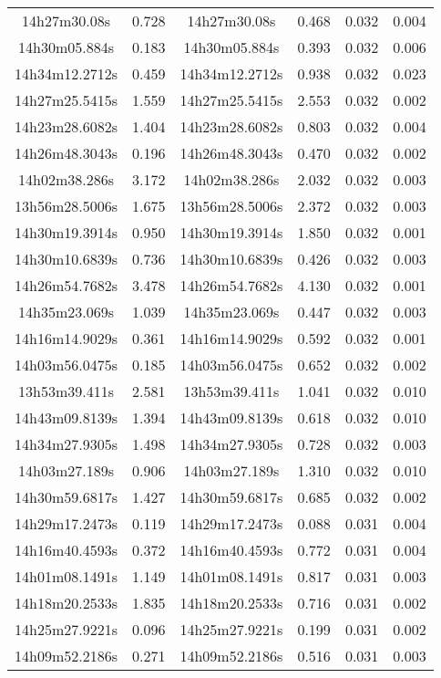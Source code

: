 \begin{table}
\begin{tabular}{cccccc}
14h27m30.08s & 0.728 & 14h27m30.08s & 0.468 & 0.032 & 0.004 \\
14h30m05.884s & 0.183 & 14h30m05.884s & 0.393 & 0.032 & 0.006 \\
14h34m12.2712s & 0.459 & 14h34m12.2712s & 0.938 & 0.032 & 0.023 \\
14h27m25.5415s & 1.559 & 14h27m25.5415s & 2.553 & 0.032 & 0.002 \\
14h23m28.6082s & 1.404 & 14h23m28.6082s & 0.803 & 0.032 & 0.004 \\
14h26m48.3043s & 0.196 & 14h26m48.3043s & 0.470 & 0.032 & 0.002 \\
14h02m38.286s & 3.172 & 14h02m38.286s & 2.032 & 0.032 & 0.003 \\
13h56m28.5006s & 1.675 & 13h56m28.5006s & 2.372 & 0.032 & 0.003 \\
14h30m19.3914s & 0.950 & 14h30m19.3914s & 1.850 & 0.032 & 0.001 \\
14h30m10.6839s & 0.736 & 14h30m10.6839s & 0.426 & 0.032 & 0.003 \\
14h26m54.7682s & 3.478 & 14h26m54.7682s & 4.130 & 0.032 & 0.001 \\
14h35m23.069s & 1.039 & 14h35m23.069s & 0.447 & 0.032 & 0.003 \\
14h16m14.9029s & 0.361 & 14h16m14.9029s & 0.592 & 0.032 & 0.001 \\
14h03m56.0475s & 0.185 & 14h03m56.0475s & 0.652 & 0.032 & 0.002 \\
13h53m39.411s & 2.581 & 13h53m39.411s & 1.041 & 0.032 & 0.010 \\
14h43m09.8139s & 1.394 & 14h43m09.8139s & 0.618 & 0.032 & 0.010 \\
14h34m27.9305s & 1.498 & 14h34m27.9305s & 0.728 & 0.032 & 0.003 \\
14h03m27.189s & 0.906 & 14h03m27.189s & 1.310 & 0.032 & 0.010 \\
14h30m59.6817s & 1.427 & 14h30m59.6817s & 0.685 & 0.032 & 0.002 \\
14h29m17.2473s & 0.119 & 14h29m17.2473s & 0.088 & 0.031 & 0.004 \\
14h16m40.4593s & 0.372 & 14h16m40.4593s & 0.772 & 0.031 & 0.004 \\
14h01m08.1491s & 1.149 & 14h01m08.1491s & 0.817 & 0.031 & 0.003 \\
14h18m20.2533s & 1.835 & 14h18m20.2533s & 0.716 & 0.031 & 0.002 \\
14h25m27.9221s & 0.096 & 14h25m27.9221s & 0.199 & 0.031 & 0.002 \\
14h09m52.2186s & 0.271 & 14h09m52.2186s & 0.516 & 0.031 & 0.003 \\

\end{tabular}
\end{table}
